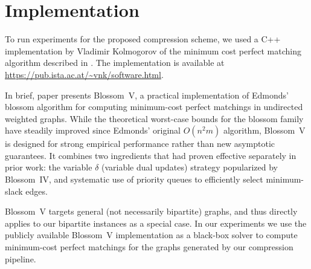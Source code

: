 \section{Implementation}
To run experiments for the proposed compression scheme, we used a C++ implementation by Vladimir Kolmogorov of the minimum cost perfect matching algorithm described in \cite{kolmogorovBlossomNewImplementation2009}. The implementation is available at \url{https://pub.ista.ac.at/~vnk/software.html}.

In brief, paper \cite{kolmogorovBlossomNewImplementation2009} presents Blossom~V, a practical implementation of Edmonds’ blossom algorithm for computing minimum-cost perfect matchings in undirected weighted graphs. While the theoretical worst-case bounds for the blossom family have steadily improved since Edmonds’ original $O(n^2m)$ algorithm, Blossom~V is designed for strong empirical performance rather than new asymptotic guarantees. It combines two ingredients that had proven effective separately in prior work: the variable $\delta$ (variable dual updates) strategy popularized by Blossom~IV, and systematic use of priority queues to efficiently select minimum-slack edges.

Blossom~V targets general (not necessarily bipartite) graphs, and thus directly applies to our bipartite instances as a special case. In our experiments we use the publicly available Blossom~V implementation as a black-box solver to compute minimum-cost perfect matchings for the graphs generated by our compression pipeline.
